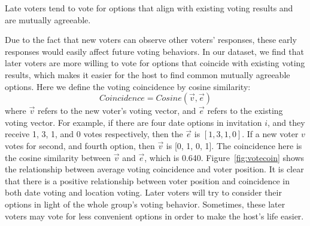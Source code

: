 \begin{observation}
Late voters tend to vote for options that align with existing voting results
and are mutually agreeable.
\end{observation}
Due to the fact that new voters can observe other voters' responses, these early
responses would easily affect future voting behaviors. In our dataset, we find
that later voters are more willing to vote for options that coincide with
existing voting results, which makes it easier for the host to find
common mutually agreeable options.  Here we define the voting coincidence by
cosine similarity:
\begin{equation}
Coincidence = Cosine(\vec{v}, \vec{e})
\end{equation}
where $\vec{v}$ refers to the new voter's voting vector, and $\vec{e}$ refers to
the existing voting vector. For example, if there are four date options in
invitation $i$, and they receive 1, 3, 1, and 0 votes respectively, then the
$\vec{e}$ is $[1, 3, 1, 0]$. If a new voter $v$ votes for second, and fourth
option, then $\vec{v}$ is [0, 1, 0, 1]. The coincidence here is the
cosine similarity between $\vec{v}$ and $\vec{e}$, which is 0.640.
Figure~\ref{fig:votecoin} shows the relationship between average voting
coincidence and voter position. It is clear that there is a positive relationship
between voter position and coincidence in both date voting and location voting.
Later voters will try to consider their options in light of the whole group's
voting behavior.  Sometimes, these later voters may vote for less convenient
options in order to make the host's life easier.





